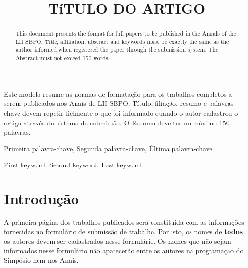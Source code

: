 \documentclass[a4paper,11pt]{article}
\begin{document}
\title{TíTULO DO ARTIGO} 

\maketitle
\thispagestyle{fancy}

\author{
}

\author{ 
}

\vspace{8mm}
\begin{resumo}
Este modelo resume as normas de formatação para os trabalhos completos a serem publicados nos Anais do LII SBPO. Título, filiação, resumo e palavras-chave devem repetir fielmente o que foi informado quando o autor cadastrou o artigo através do sistema de submissão.
O Resumo deve ter no máximo 150 palavras.
 \end{resumo}

\bigskip
\begin{palchaves}
Primeira palavra-chave, Segunda palavra-chave, Última palavra-chave.

\bigskip
{}
\end{palchaves}


\vspace{8mm}

\begin{abstract}
This document presents the format for full papers to be published in the Annals of the LII SBPO. Title, affiliation, abstract and keywords must be exactly the same as the author informed when registered the paper through the submission system. The Abstract must not exceed 150 words.
\end{abstract}

\bigskip
\begin{keywords}
First keyword. Second keyword. Last keyword.

\bigskip
{}
\end{keywords}

 
\newpage
\section{Introdução} 
 
A primeira página dos trabalhos publicados será constituída com as informações fornecidas no formulário de submissão de trabalho. Por isto, os nomes de \textbf {todos} os autores devem ser cadastrados nesse formulário. Os nomes que não sejam informados nesse formulário não aparecerão entre os autores na programação do Simpósio nem nos Anais.
\end{document}
